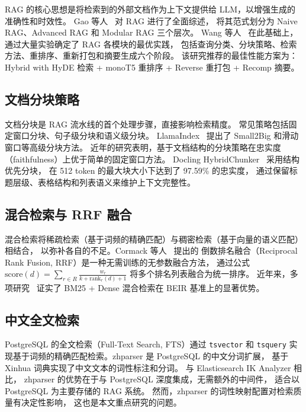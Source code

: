 \documentclass[a4paper, 12pt]{ctexart}
\begin{document}
RAG 的核心思想是将检索到的外部文档作为上下文提供给 LLM，以增强生成的准确性和时效性。
Gao 等人~\cite{gao2023rag} 对 RAG 进行了全面综述，
将其范式划分为 Naive RAG、Advanced RAG 和 Modular RAG 三个层次。
Wang 等人~\cite{wang2024rag_bpractices} 在此基础上，
通过大量实验确定了 RAG 各模块的最优实践，
包括查询分类、分块策略、检索方法、重排序、重新打包和摘要生成六个阶段。
该研究推荐的最佳性能方案为：
Hybrid with HyDE 检索 + monoT5 重排序 + Reverse 重打包 + Recomp 摘要。

\subsection{文档分块策略}

文档分块是 RAG 流水线的首个处理步骤，直接影响检索精度。
常见策略包括固定窗口分块、句子级分块和语义级分块。
LlamaIndex~\cite{liu2022llamaindex} 提出了 Small2Big 和滑动窗口等高级分块方法。
近年的研究表明，基于文档结构的分块策略在忠实度（faithfulness）上优于简单的固定窗口方法。
Docling HybridChunker~\cite{docling} 采用结构优先分块，
在 512 token 的最大块大小下达到了 97.59\% 的忠实度，
通过保留标题层级、表格结构和列表语义来维护上下文完整性。

\subsection{混合检索与 RRF 融合}

混合检索将稀疏检索（基于词频的精确匹配）与稠密检索（基于向量的语义匹配）相结合，
以弥补各自的不足。Cormack 等人~\cite{cormack2009rrf} 提出的
倒数排名融合（Reciprocal Rank Fusion, RRF）是一种无需训练的无参数融合方法，
通过公式 $\text{score}(d) = \sum_{r \in R} \frac{w_r}{k + \text{rank}_r(d) + 1}$
将多个排名列表融合为统一排序。
近年来，多项研究~\cite{sawarkar2024hybrid} 证实了
BM25 + Dense 混合检索在 BEIR 基准上的显著优势。

\subsection{中文全文检索}

PostgreSQL 的全文检索（Full-Text Search, FTS）通过 \texttt{tsvector} 和 \texttt{tsquery}
实现基于词频的精确匹配检索。zhparser 是 PostgreSQL 的中文分词扩展，
基于 Xinhua 词典实现了中文文本的词性标注和分词。
与 Elasticsearch IK Analyzer 相比，
zhparser 的优势在于与 PostgreSQL 深度集成，无需额外的中间件，
适合以 PostgreSQL 为主要存储的 RAG 系统。
然而，zhparser 的词性映射配置对检索质量有决定性影响，
这也是本文重点研究的问题。
\end{document}
